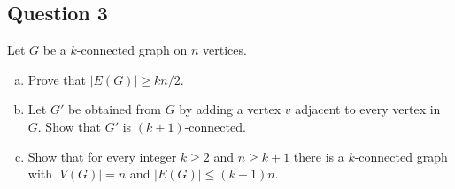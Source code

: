 \subsection{Question 3}
Let \( G \) be a \( k \)-connected graph on \( n \) vertices. 
\begin{enumerate}[(a), leftmargin=1cm]
	\item Prove that \( |E(G)| \geq kn/2 \).
	\item Let \( G' \) be obtained from \( G \) by adding a vertex \( v \) adjacent to every vertex in \( G \). Show that \( G' \) is \( (k+1) \)-connected.
	\item Show that for every integer \( k \geq 2 \) and \( n \geq k + 1 \) there is a \( k \)-connected graph with \( |V(G)| = n \) and \( |E(G)| \leq (k-1)n \).
\end{enumerate}
